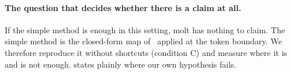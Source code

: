 \paragraph{The question that decides whether there is a claim at all.}
If the simple method is enough in this setting, molt has nothing to claim.
The simple method is the closed-form map of~\citep{heo2026crossmodel} applied at the token boundary.
We therefore reproduce it without shortcuts (condition C) and measure where it is and is not enough.
 states plainly where our own hypothesis fails.
